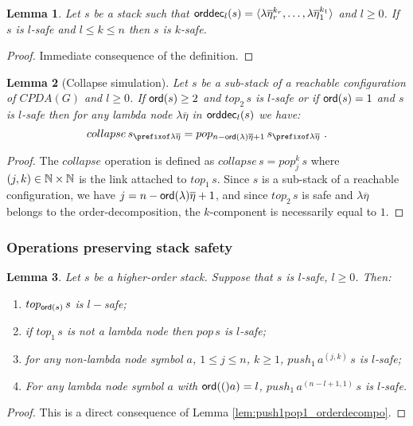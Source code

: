\documentclass[a4paper]{article}
\newtheorem{lemma}{Lemma}[section]
\theoremstyle{remark}
\theoremstyle{definition}
\newcommand\orddec{{\sf orddec}}
\begin{document}
\begin{lemma}
\label{lem:stacksafety_immediate results}
Let $s$ be a stack such that $\orddec_l(s) = \langle \lambda \overline\eta_r^{k_r}, \ldots, \lambda \overline{\eta}_1^{k_1} \rangle$ and $l\geq 0$.
If $s$ is $l$-safe and $l \leq k \leq n$ then $s$ is $k$-safe.
\end{lemma}
\begin{proof}
Immediate consequence of the definition.
\end{proof}

\begin{lemma}[Collapse simulation]
\label{lem:safecollapsesimulation}
Let $s$ be a sub-stack of a reachable configuration of $CPDA(G)$ and $l\geq 0$.
If ${\sf ord}(s) \geq 2$ and $top_2\,s$ is $l$-safe or if ${\sf ord}(s) = 1$ and $s$ is $l$-safe then for any lambda node $\lambda\overline\eta$ in $\orddec_l(s)$ we have:
$$collapse\,s_{\prefixof\lambda\overline\eta} = pop_{n-\ord \lambda\overline\eta +1}\,s_{\prefixof\lambda\overline\eta} \ . $$
\end{lemma}
\begin{proof}
The $collapse$ operation is defined as  $collapse\,s = pop_j^k\,s$ where $(j,k)\in\mathbb{N}\times\mathbb{N}$ is the link attached to $top_1\,s$.
Since $s$ is a sub-stack of a reachable configuration, we have $j = n-{\sf ord}(\lambda)\overline\eta +1$, and since
$top_2\,s$ is safe and $\lambda\overline\eta$ belongs to the order-decomposition, the $k$-component is necessarily equal to $1$.
\end{proof}


\subsubsection*{Operations preserving stack safety}
\begin{lemma}
\label{lem:push1pop1_preserves_safety} Let $s$ be a higher-order
stack. Suppose that $s$ is $l$-safe, $l\geq0$. Then:
    \begin{enumerate}
    \item $top_{{\sf ord}(s)}\,s$ is $l-$safe;
    \item if $top_1\,s$ is not a lambda node then $pop\,s$ is $l$-safe;
    \item for any non-lambda node symbol $a$, $1 \leq j \leq n$, $k \geq 1$, $push_1\,a^{(j,k)}\,s$ is $l$-safe;
    \item For any lambda node symbol $a$ with ${\sf ord}(()a) = l$, $push_1\,a^{(n-l+1,1)}\,s$ is $l$-safe.
\end{enumerate}
\end{lemma}
\begin{proof}
This is a direct consequence of Lemma \ref{lem:push1pop1_orderdecompo}.
\end{proof}
\end{document}
